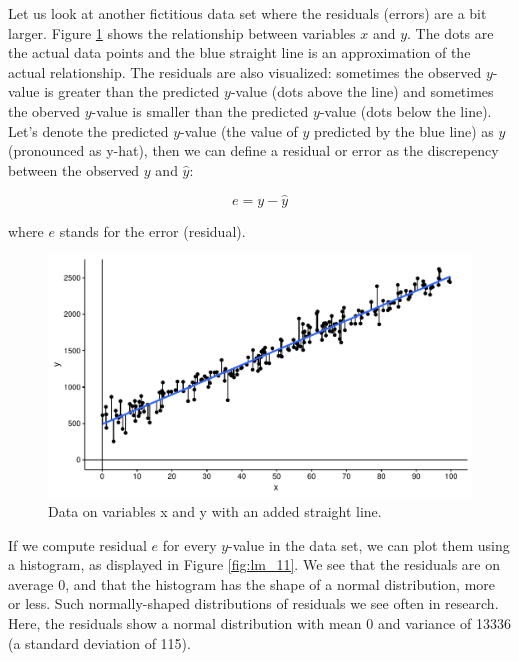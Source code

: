 \documentclass[]{book}\usepackage[]{graphicx}\usepackage[]{color}
\makeatletter
\def\maxwidth{ %
  \ifdim\Gin@nat@width>\linewidth
    \linewidth
  \else
    \Gin@nat@width
  \fi
}
\newenvironment{knitrout}{}{} %
\makeatother
\begin{document}
Let us look at another fictitious data set where the residuals (errors) are a bit larger. Figure \ref{fig:lm_10} shows the relationship between variables $x$ and $y$. The dots are the actual data points and the blue straight line is an approximation of the actual relationship. The residuals are also visualized: sometimes the observed $y$-value is greater than the predicted $y$-value (dots above the line) and sometimes the oberved $y$-value is smaller than the predicted $y$-value (dots below the line). Let's denote the predicted $y$-value (the value of $y$ predicted by the blue line) as $\hat{y}$ (pronounced as y-hat), then we can define a residual or error as the discrepency between the observed $y$ and $\hat{y}$:

\begin{equation}
e = y - \hat{y}
\end{equation}

where $e$ stands for the error (residual).


\begin{knitrout}
\color{fgcolor}\begin{figure}

{\centering \includegraphics[width=\maxwidth]{figure/lm_10-1} 

}

\caption[Data on variables x and y with an added straight line]{Data on variables x and y with an added straight line.}\label{fig:lm_10}
\end{figure}


\end{knitrout}

If we compute residual $e$ for every $y$-value in the data set, we can plot them using a histogram, as displayed in Figure \ref{fig:lm_11}. We see that the residuals are on average 0, and that the histogram has the shape of a normal distribution, more or less. Such normally-shaped distributions of residuals we see often in research. Here, the residuals show a normal distribution with mean 0 and variance of 13336 (a standard deviation of 115).
\end{document}
